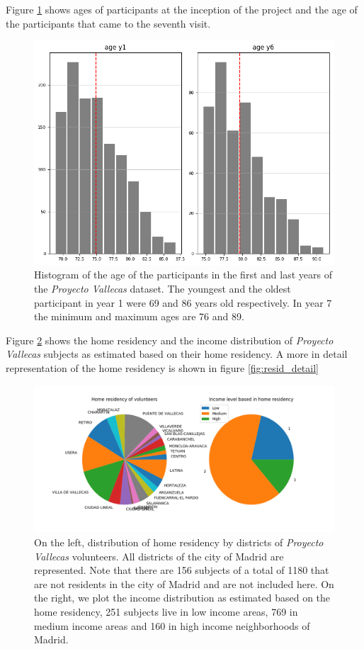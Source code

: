 \documentclass[11pt]{article}
\theoremstyle{definition}
\theoremstyle{remark}
\begin{document}
Figure \ref{fig:ages} shows ages of participants at the inception of the project and the age of the participants that came to the seventh visit.

\begin{figure}[H]
        \centering
        \includegraphics[keepaspectratio, width=.6\linewidth]{figures/Fig_ages}
        \caption{Histogram of the age of the participants in the first and last years of the \emph{Proyecto Vallecas} dataset. The youngest and the oldest participant in year 1 were 69 and 86 years old respectively. In year 7 the minimum and maximum ages are 76 and 89.} 
        \label{fig:ages}
\end{figure}


Figure \ref{fig:incomeresidency} shows the home residency and the income distribution of \emph{Proyecto Vallecas} subjects as estimated based on their home residency. A more in detail representation of the home residency is shown in figure \ref{fig:resid_detail}

\begin{figure}[H]
        \centering
        \includegraphics[keepaspectratio, width=.8\linewidth]{figures/incomeresidency}
        \caption{On the left, distribution of home residency by districts of \emph{Proyecto Vallecas} volunteers. All districts of the city of Madrid are represented. Note that there are 156 subjects of a total of 1180 that are not residents in the city of Madrid and are not included here. On the right, we plot the income distribution as estimated based on the home residency, 251 subjects live in low income areas, 769 in medium income areas and 160 in high income neighborhoods of Madrid.
        } \label{fig:incomeresidency}
\end{figure}
\end{document}
